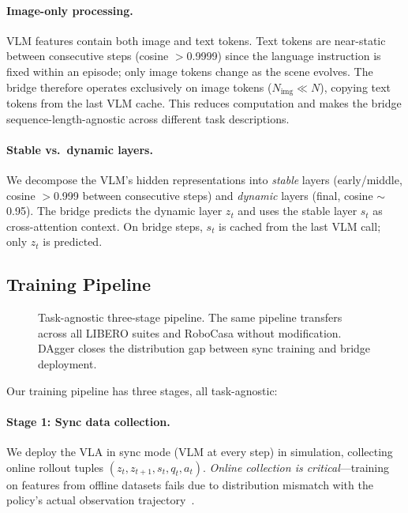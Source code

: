 \documentclass{article}
\begin{document}
\paragraph{Image-only processing.}
VLM features contain both image and text tokens.
Text tokens are near-static between consecutive steps (cosine $>$0.9999) since the language instruction is fixed within an episode; only image tokens change as the scene evolves.
The bridge therefore operates exclusively on image tokens ($N_\text{img} \ll N$), copying text tokens from the last VLM cache.
This reduces computation and makes the bridge sequence-length-agnostic across different task descriptions.

\paragraph{Stable vs.\ dynamic layers.}
We decompose the VLM's hidden representations into \emph{stable} layers (early/middle, cosine $>$0.999 between consecutive steps) and \emph{dynamic} layers (final, cosine $\sim$0.95).
The bridge predicts the dynamic layer $z_t$ and uses the stable layer $s_t$ as cross-attention context.
On bridge steps, $s_t$ is cached from the last VLM call; only $z_t$ is predicted.

\subsection{Training Pipeline}

\begin{figure}[t]
\centering
{}
\caption{Task-agnostic three-stage pipeline. The same pipeline transfers across all LIBERO suites and RoboCasa without modification. DAgger closes the distribution gap between sync training and bridge deployment.}
\label{fig:pipeline}
\end{figure}

Our training pipeline has three stages, all task-agnostic:

\paragraph{Stage 1: Sync data collection.}
\label{sec:training}
We deploy the VLA in sync mode (VLM at every step) in simulation, collecting online rollout tuples $(z_t, z_{t+1}, s_t, q_t, a_t)$.
\emph{Online collection is critical}---training on features from offline datasets fails due to distribution mismatch with the policy's actual observation trajectory~\cite{ross2011reduction}.
\end{document}

